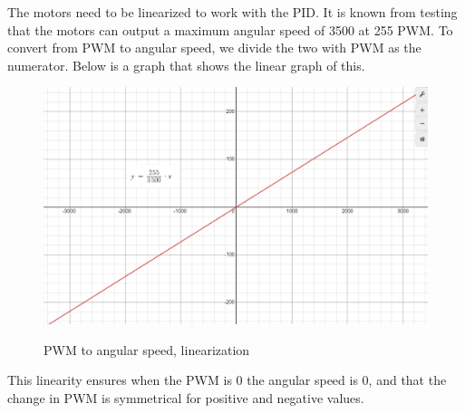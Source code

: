 The motors need to be linearized to work with the PID. It is known from testing that the motors can output a maximum angular speed of 3500 at 255 PWM. To convert from PWM to angular speed, we divide the two with PWM as the numerator. Below is a graph that shows the linear graph of this.

\begin{figure}[H]
\begin{center}
   \includegraphics[width=\textwidth]{pictures/control/Linearization.png}
   \label{linerizationgraph}
\end{center}
\caption{PWM to angular speed, linearization}
\end{figure}

This linearity ensures when the PWM is 0 the angular speed is 0, and that the change in PWM is symmetrical for positive and negative values.